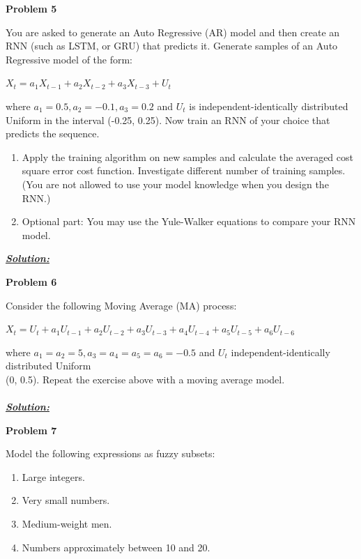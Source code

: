 \documentclass{article}
\begin{document}
\newpage
\noindent \textbf{Problem 5}

\noindent You are asked to generate an Auto Regressive (AR) model and then create an RNN (such 
as LSTM, or GRU) that predicts it. Generate samples of an Auto Regressive model of 
the form: 
\begin{center}
    $X_t = a_1X_{t-1} + a_2X_{t-2} + a_3X_{t-3} + U_t$
    
\end{center}
where $a_1= 0.5, a_2= -0.1, a_3= 0.2$ and $U_t$ is independent-identically distributed Uniform in 
the interval (-0.25, 0.25). Now train an RNN of your choice that predicts the sequence. 

\begin{enumerate} [label=\Alph*]
    \item Apply the training algorithm on new samples and calculate the averaged cost square 
    error cost function. Investigate different number of training samples. (You are not 
    allowed to use your model knowledge when you design the RNN.)
    \item Optional part: You may use the Yule-Walker equations to compare your RNN 
    model. 
    
\end{enumerate}

\vspace{1cm}

\noindent \underline{\textbf{\textit{Solution:}}}


\newpage
\noindent \textbf{Problem 6}

\noindent Consider the following Moving Average (MA) process:
\begin{center}
    $X_t = U_t + a_1U_{t-1} + a_2U_{t-2} + a_3U_{t-3} + a_4U_{t-4}+ a_5U_{t-5}+ a_6U_{t-6}$
\end{center}
\noindent where $a_1= a_2=5, a_3=a_4=a_5=a_6= -0.5$ and $U_t$ independent-identically distributed Uniform \\
(0, 0.5). 
Repeat the exercise above with a moving average model. \\ \\

\noindent \underline{\textbf{\textit{Solution:}}}



\newpage
\noindent \textbf{Problem 7}

\noindent Model the following expressions as fuzzy subsets:
\begin{enumerate} [label = \Alph*]
    \item Large integers.
    \item Very small numbers.
    \item Medium-weight men.
    \item Numbers approximately between 10 and 20.
\end{enumerate}
\end{document}
